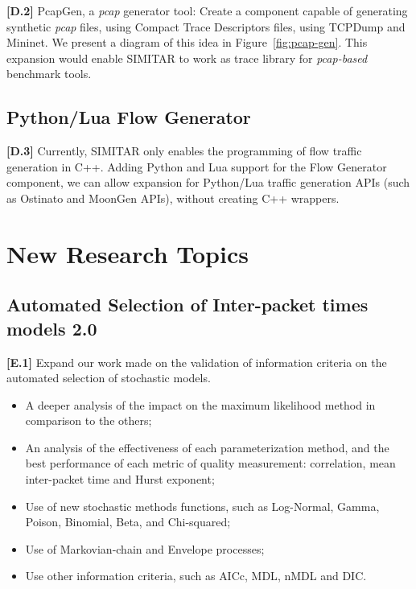 \textbf{[D.2]} PcapGen, a \textit{pcap} generator tool: Create a component capable of generating synthetic \textit{pcap} files, using Compact Trace Descriptors files, using TCPDump\cite{web-tcpdump} and Mininet\cite{web-mininet}.  We present a diagram of this idea in Figure~\ref{fig:pcap-gen}. This expansion would enable SIMITAR to work as trace library for \textit{pcap-based} benchmark tools.

\subsection{Python/Lua Flow Generator}

\textbf{[D.3]} Currently, SIMITAR only enables the programming of flow traffic generation in C++. Adding Python and Lua support for the Flow Generator component, we can allow expansion for Python/Lua traffic generation APIs (such as Ostinato and MoonGen APIs), without creating C++ wrappers. 


\section{New Research Topics}


\subsection{Automated Selection of Inter-packet times models 2.0}

\textbf{[E.1]} Expand our work made on the validation of information criteria on the automated selection of stochastic models. 
\begin{itemize}
\item A deeper analysis of the impact on the maximum likelihood method in comparison to the others;
\item An analysis of the effectiveness of each parameterization method, and the best performance of each metric of quality measurement: correlation,  mean inter-packet time and Hurst exponent; 
\item Use of new stochastic methods functions, such as Log-Normal, Gamma, Poison, Binomial, Beta, and Chi-squared;
\item Use of Markovian-chain and Envelope processes;
\item Use other information criteria, such as \acrshort{AICc}, \acrshort{MDL}, \acrshort{nMDL}\cite{information-criteria} and \acrshort{DIC}\cite{dic-paper}.
\end{itemize}

